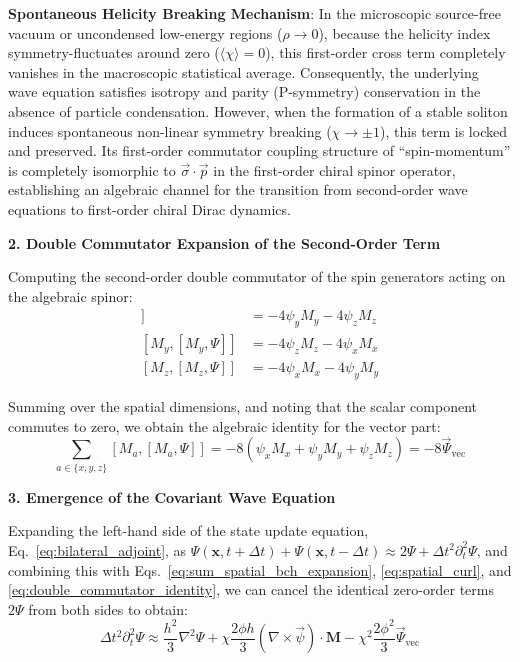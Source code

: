 \documentclass[12pt, a4paper]{article}
\begin{document}
\textbf{Spontaneous Helicity Breaking Mechanism}: In the microscopic source-free vacuum or uncondensed low-energy regions ($\rho \to 0$), because the helicity index symmetry-fluctuates around zero ($\langle \chi \rangle = 0$), this first-order cross term completely vanishes in the macroscopic statistical average. Consequently, the underlying wave equation satisfies isotropy and parity (P-symmetry) conservation in the absence of particle condensation. However, when the formation of a stable soliton induces spontaneous non-linear symmetry breaking ($\chi \to \pm 1$), this term is locked and preserved. Its first-order commutator coupling structure of ``spin-momentum'' is completely isomorphic to $\vec{\sigma} \cdot \vec{p}$ in the first-order chiral spinor operator, establishing an algebraic channel for the transition from second-order wave equations to first-order chiral Dirac dynamics.

\textbf{2. Double Commutator Expansion of the Second-Order Term}

Computing the second-order double commutator of the spin generators acting on the algebraic spinor:
\begin{align*}
[M_x, [M_x, \Psi]] &= -4\psi_y M_y - 4\psi_z M_z \\
[M_y, [M_y, \Psi]] &= -4\psi_z M_z - 4\psi_x M_x \\
[M_z, [M_z, \Psi]] &= -4\psi_x M_x - 4\psi_y M_y
\end{align*}

Summing over the spatial dimensions, and noting that the scalar component commutes to zero, we obtain the algebraic identity for the vector part:
\begin{equation}
\label{eq:double_commutator_identity}
\sum_{a \in \{x,y,z\}} [M_a, [M_a, \Psi]] = -8 (\psi_x M_x + \psi_y M_y + \psi_z M_z) = -8 \vec{\Psi}_{\text{vec}}
\end{equation}

\textbf{3. Emergence of the Covariant Wave Equation}

Expanding the left-hand side of the state update equation, Eq.~\eqref{eq:bilateral_adjoint}, as $\Psi(\mathbf{x}, t+\Delta t) + \Psi(\mathbf{x}, t-\Delta t) \approx 2\Psi + \Delta t^2 \partial_t^2 \Psi$, and combining this with Eqs.~\eqref{eq:sum_spatial_bch_expansion}, \eqref{eq:spatial_curl}, and \eqref{eq:double_commutator_identity}, we can cancel the identical zero-order terms $2\Psi$ from both sides to obtain:
\begin{equation}
\label{eq:expanded_discrete_wave}
\Delta t^2 \partial_t^2 \Psi \approx \frac{h^2}{3}\nabla^2\Psi + \chi \frac{2\phi h}{3} \left( \nabla \times \vec{\psi} \right) \cdot \mathbf{M} - \chi^2 \frac{2 \phi^2}{3} \vec{\Psi}_{\text{vec}}
\end{equation}
\end{document}
